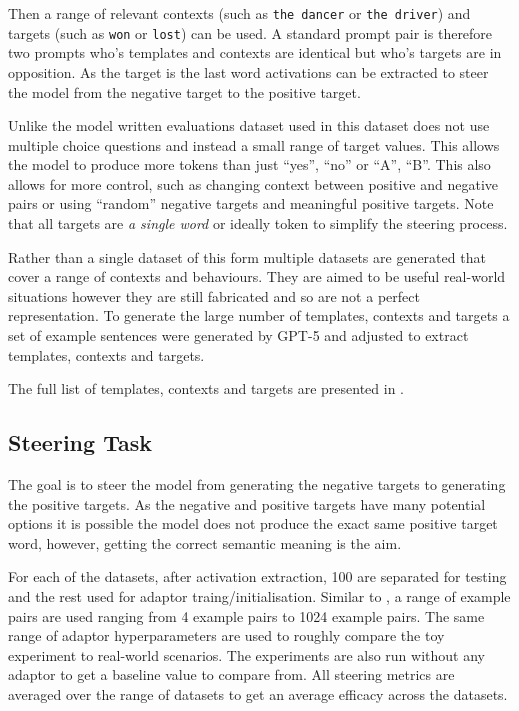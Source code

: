 Then a range of relevant contexts (such as \texttt{the dancer} or \texttt{the driver}) and targets (such as \texttt{won} or \texttt{lost}) can be used.
A standard prompt pair is therefore two prompts who's templates and contexts are identical but who's targets are in opposition.
As the target is the last word activations can be extracted to steer the model from the negative target to the positive target.

Unlike the model written evaluations \citep{mwe} dataset used in \citet{steerability} this dataset does not use multiple choice questions and instead a small range of target values.
This allows the model to produce more tokens than just ``yes'', ``no'' or ``A'', ``B''.
This also allows for more control, such as changing context between positive and negative pairs or using ``random'' negative targets and meaningful positive targets.
Note that all targets are \emph{a single word} or ideally token to simplify the steering process.

Rather than a single dataset of this form multiple datasets are generated that cover a range of contexts and behaviours.
They are aimed to be useful real-world situations however they are still fabricated and so are not a perfect representation.
To generate the large number of templates, contexts and targets a set of example sentences were generated by GPT-5 \citep{gpt-5} and adjusted to extract templates, contexts and targets.

The full list of templates, contexts and targets are presented in .

\subsection{Steering Task}

The goal is to steer the model from generating the negative targets to generating the positive targets.
As the negative and positive targets have many potential options it is possible the model does not produce the exact same positive target word, however, getting the correct semantic meaning is the aim.

For each of the datasets, after activation extraction, 100 are separated for testing and the rest used for adaptor traing/initialisation.
Similar to \citet{steering-clear}, a range of example pairs are used ranging from 4 example pairs to 1024 example pairs.
The same range of adaptor hyperparameters are used to roughly compare the toy experiment to real-world scenarios.
The experiments are also run without any adaptor to get a baseline value to compare from.
All steering metrics are averaged over the range of datasets to get an average efficacy across the datasets.

